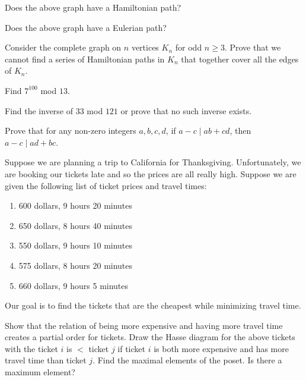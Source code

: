 \documentclass[12pt,twoside]{article}
\begin{document}
\begin{problem}{10}
\bparts
{} Does the above graph have a Hamiltonian path?

 Does the above graph have a Eulerian path?

 Consider the complete graph on $n$ vertices $K_n$ for odd $n \geq 3$.  Prove that we cannot find a series of Hamiltonian paths in $K_n$ that together cover all the edges of $K_n$.  

\eparts
\end{problem}





\begin{problem}{10}
\bparts
{}  Find $7^{100}$ mod $13$.

 Find the inverse of $33$ mod $121$ or prove that no such inverse exists.

 Prove that for any non-zero integers $a, b, c, d$, if $a - c \mid ab + cd$, then $a - c \mid ad + bc$.

\eparts
\end{problem}





\begin{problem}{10}
Suppose we are planning a trip to California for Thanksgiving.  Unfortunately, we are booking our tickets late and so the prices are all really high. Suppose we are given the following list of ticket prices and travel times:

\begin{enumerate}[label=\Alph*]
\item 600 dollars, 9 hours 20 minutes
\item 650 dollars, 8 hours 40 minutes
\item 550 dollars, 9 hours 10 minutes
\item 575 dollars, 8 hours 20 minutes
\item 660 dollars, 9 hours 5 minutes
\end{enumerate}

Our goal is to find the tickets that are the cheapest while minimizing travel time.

\bparts
{} Show that the relation of being more expensive and having more travel time creates a partial order for tickets.
 Draw the Hasse diagram for the above tickets with the ticket $i$ is $<$ ticket $j$ if ticket $i$ is both more expensive and has more travel time than ticket $j$.
 Find the maximal elements of the poset.  Is there a maximum element? 
\eparts
\end{problem}
\end{document}
